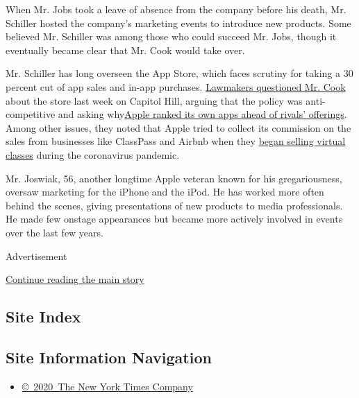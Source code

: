 When Mr. Jobs took a leave of absence from the company before his death,
Mr. Schiller hosted the company's marketing events to introduce new
products. Some believed Mr. Schiller was among those who could succeed
Mr. Jobs, though it eventually became clear that Mr. Cook would take
over.

Mr. Schiller has long overseen the App Store, which faces scrutiny for
taking a 30 percent cut of app sales and in-app purchases.
\href{https://www.nytimes.com/2020/07/29/technology/big-tech-hearing-apple-amazon-facebook-google.html}{Lawmakers
questioned Mr. Cook} about the store last week on Capitol Hill, arguing
that the policy was anti-competitive and asking
why\href{https://www.nytimes.com/interactive/2019/09/09/technology/apple-app-store-competition.html}{Apple
ranked its own apps ahead of rivals' offerings}. Among other issues,
they noted that Apple tried to collect its commission on the sales from
businesses like ClassPass and Airbnb when they
\href{https://www.nytimes.com/2020/07/28/technology/apple-app-store-airbnb-classpass.html}{began
selling virtual classes} during the coronavirus pandemic.

Mr. Joswiak, 56, another longtime Apple veteran known for his
gregariousness, oversaw marketing for the iPhone and the iPod. He has
worked more often behind the scenes, giving presentations of new
products to media professionals. He made few onstage appearances but
became more actively involved in events over the last few years.

Advertisement

\protect\hyperlink{after-bottom}{Continue reading the main story}

\hypertarget{site-index}{%
\subsection{Site Index}\label{site-index}}

\hypertarget{site-information-navigation}{%
\subsection{Site Information
Navigation}\label{site-information-navigation}}

\begin{itemize}
\tightlist
\item
  \href{https://help.nytimes.com/hc/en-us/articles/115014792127-Copyright-notice}{©~2020~The
  New York Times Company}
\end{itemize}

